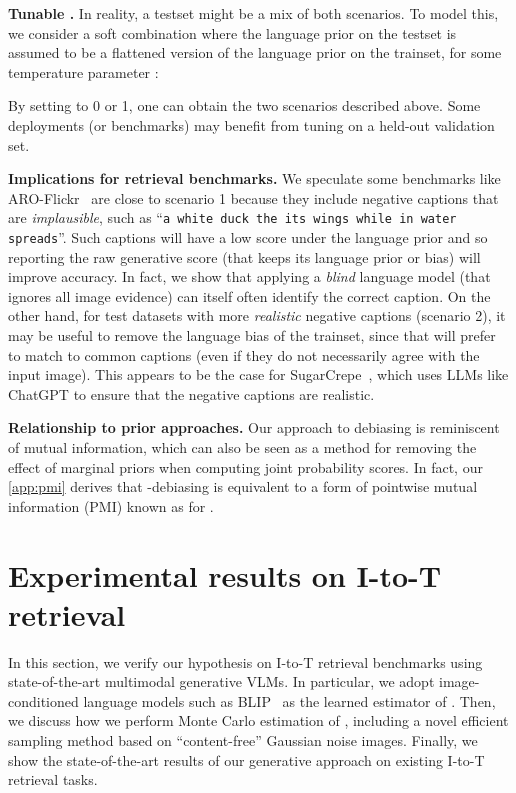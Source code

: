 \documentclass{article} \usepackage{iclr2024_conference,times}
\begin{document}
{\bf Tunable .} In reality, a testset might be a mix of both scenarios. To model this, we consider a soft combination where the language prior on the testset is assumed to be a flattened version of the language prior on the trainset, for some temperature parameter :

By setting  to 0 or 1, one can obtain the two scenarios described above. Some deployments
(or benchmarks) may benefit from tuning  on a held-out validation set.



{\bf Implications for retrieval benchmarks.} We speculate some benchmarks like ARO-Flickr~\citep{aro} are close to scenario 1 because they include negative captions  that are {\em implausible}, such as ``{\tt a white duck the its wings while in water spreads}''. Such captions will have a low score under the language prior  and so reporting the raw generative score  (that keeps its language prior or bias) will improve accuracy. In fact, we show that applying a {\em blind} language model (that ignores all image evidence) can itself often identify the correct caption. On the other hand, for test datasets with more {\em realistic} negative captions (scenario 2), it may be useful to remove the language bias of the trainset, since that will prefer to match to common captions (even if they do not necessarily agree with the input image). This appears to be the case for SugarCrepe~\citep{sugarcrepe}, which uses LLMs like ChatGPT to ensure that the negative captions are realistic. 

{\bf Relationship to prior approaches.} Our approach to debiasing is reminiscent of mutual information, which can also be seen as a method for removing the
effect of marginal priors when computing joint probability scores. In fact, our \autoref{app:pmi} derives that -debiasing is equivalent to a form of pointwise mutual information (PMI) known as  for .

\section{Experimental results on I-to-T retrieval}
\label{sec:visual_gpt_score}
In this section, we verify our hypothesis on I-to-T retrieval benchmarks using state-of-the-art multimodal generative VLMs. In particular, we adopt image-conditioned language models such as BLIP~\citep{blip} as the learned estimator of . Then, we discuss how we perform Monte Carlo estimation of , including a novel efficient sampling method based on ``content-free'' Gaussian noise images. Finally, we show the state-of-the-art results of our generative approach on existing I-to-T retrieval tasks.
\end{document}
